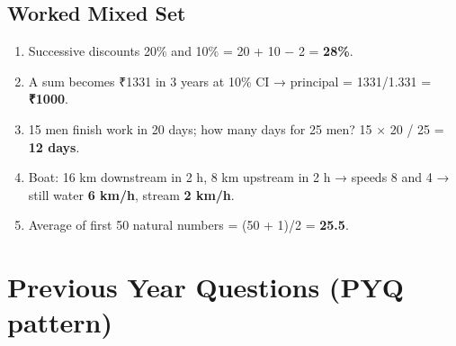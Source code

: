 \needspace{95pt}

\hypertarget{p1-05--68-worked-mixed-set}{%
\subsection{Worked Mixed Set}\label{p1-05--68-worked-mixed-set}}

\begin{enumerate}
\def\labelenumi{\arabic{enumi}.}
\tightlist
\item
  Successive discounts 20\% and 10\% = 20 + 10 − 2 = \textbf{28\%}.
\item
  A sum becomes ₹1331 in 3 years at 10\% CI → principal = 1331/1.331 = \textbf{₹1000}.
\item
  15 men finish work in 20 days; how many days for 25 men? 15 × 20 / 25 = \textbf{12 days}.
\item
  Boat: 16 km downstream in 2 h, 8 km upstream in 2 h → speeds 8 and 4 → still water \textbf{6 km/h}, stream \textbf{2 km/h}.
\item
  Average of first 50 natural numbers = (50 + 1)/2 = \textbf{25.5}.
\end{enumerate}

\needspace{95pt}

\hypertarget{p1-05--previous-year-questions-pyq-pattern}{%
\section{Previous Year Questions (PYQ pattern)}\label{p1-05--previous-year-questions-pyq-pattern}}

